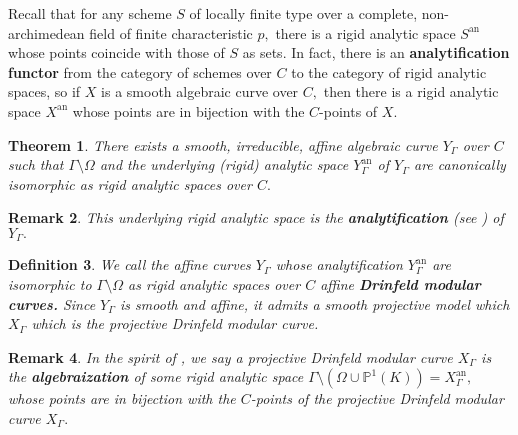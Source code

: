 \documentclass[11pt]{amsart}
\newtheorem{theorem}{Theorem}[section]
\newtheorem{definition}[theorem]{Definition}
\newtheorem{remark}[theorem]{Remark}
\theoremstyle{definition}
\numberwithin{equation}{section}
\newcommand{\GL}{\mathrm{GL}} 	%
\newcommand{\cM}{\mathcal{M}}		%
\newcommand{\bbP}{\mathbb{P}}		%
\begin{document}
		Recall that for any scheme $S$ of locally finite type over a complete, non-archimedean field of finite characteristic $p,$ there is a rigid analytic space $S^{\text{an}}$ whose points coincide with those of $S$ as sets. In fact, there is an \textbf{analytification functor} from the category of schemes over $C$ to the category of rigid analytic spaces, so if $X$ is a smooth algebraic curve over $C,$ then there is a rigid analytic space $X^{\text{an}}$ whose points are in bijection with the $C$-points of $X.$ 
		
		\begin{theorem}\cite{Drinfeld-elliptic-modules}
			There exists a smooth, irreducible, affine algebraic curve $Y_{\Gamma}$ over $C$ such that $\Gamma\setminus \Omega$ and the underlying (rigid) analytic space $Y_{\Gamma}^{\text{an}}$ of $Y_{\Gamma}$ are canonically isomorphic as rigid analytic spaces over $C.$ 
		\end{theorem}
		\begin{remark}
			This underlying rigid analytic space is the \textbf{analytification} (see \cite[Example $4.3.3$]{Frensel-vanderPut-Rigid-Analytic_Geom}) of $Y_{\Gamma}.$ 
		\end{remark}
		
		\begin{definition}
			We call the affine curves $Y_{\Gamma}$ whose analytification $Y_{\Gamma}^{\text{an}}$ are isomorphic to $\Gamma\setminus \Omega$ as rigid analytic spaces over $C$ affine \textbf{Drinfeld modular curves.} Since $Y_{\Gamma}$ is smooth and affine, it admits a smooth projective model which $X_{\Gamma}$ which is the projective Drinfeld modular curve. 
		\end{definition}
		
		
		\begin{remark}
			In the spirit of \cite[Section $6.2$]{VZB}, we say a projective Drinfeld modular curve $X_{\Gamma}$ is the \textbf{algebraization} of some rigid analytic space $\Gamma\setminus (\Omega\cup \bbP^1(K))=X_{\Gamma}^{\text{an}},$ whose points are in bijection with the $C$-points of the projective Drinfeld modular curve $X_{\Gamma}.$ 
		\end{remark}
		
\end{document}
